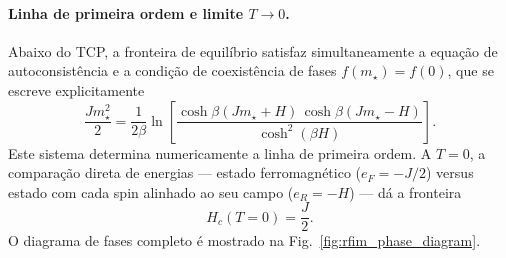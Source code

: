 \documentclass[12pt,a4paper]{article}
\begin{document}
\paragraph{Linha de primeira ordem e limite $T\to0$.}
Abaixo do TCP, a fronteira de equilíbrio satisfaz simultaneamente
a equação de autoconsistência e a condição de coexistência de fases
$f(m_\star)=f(0)$, que se escreve explicitamente
%
\begin{equation}
    \frac{Jm_\star^2}{2}
    =
    \frac{1}{2\beta}
    \ln\!\left[
        \frac{
        \cosh\beta(Jm_\star+H)\,\cosh\beta(Jm_\star-H)
        }{
        \cosh^2(\beta H)
        }
    \right].
    \label{eq:coexistence}
\end{equation}
%
Este sistema determina numericamente a linha de primeira ordem.
A $T=0$, a comparação direta de energias --- estado ferromagnético
($e_F=-J/2$) versus estado com cada spin alinhado ao seu campo
($e_R=-H$) --- dá a fronteira
%
\begin{equation}
    \boxed{H_c(T=0)=\frac{J}{2}.}
\end{equation}
%
O diagrama de fases completo é mostrado na Fig.~\ref{fig:rfim_phase_diagram}.
\end{document}
